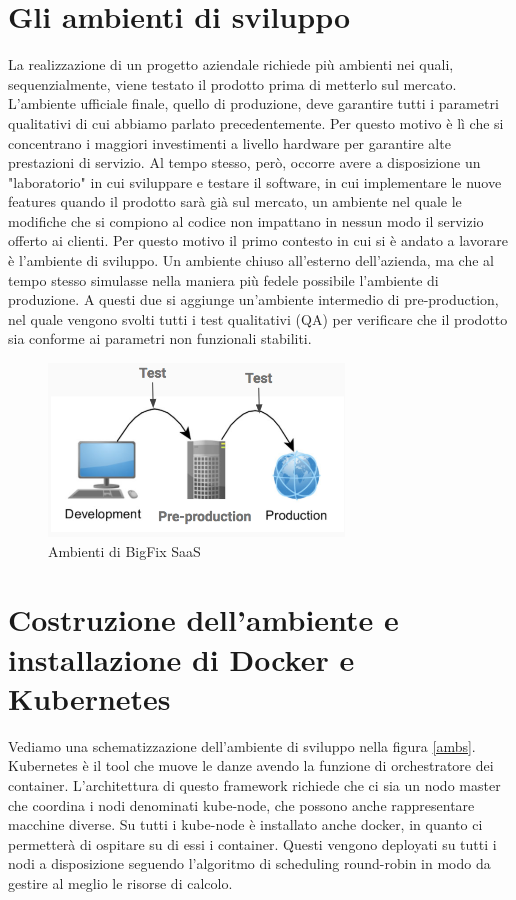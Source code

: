 \section{Gli ambienti di sviluppo }
La realizzazione di un progetto aziendale richiede più ambienti nei quali, sequenzialmente, viene testato il prodotto prima di metterlo sul mercato. L'ambiente ufficiale finale, quello di produzione, deve garantire tutti i parametri qualitativi di cui abbiamo parlato precedentemente. Per questo motivo è lì che si concentrano i maggiori investimenti a livello hardware per garantire alte prestazioni di servizio. Al tempo stesso, però, occorre avere a disposizione un "laboratorio" in cui sviluppare e testare il software, in cui implementare le nuove features quando il prodotto sarà già sul mercato, un ambiente nel quale le modifiche che si compiono al codice non impattano in nessun modo il servizio offerto ai clienti. Per questo motivo il primo contesto in cui si è andato a lavorare è l'ambiente di sviluppo. Un ambiente chiuso all'esterno dell'azienda, ma che al tempo stesso simulasse nella maniera più fedele possibile l'ambiente di produzione. A questi due si aggiunge un'ambiente intermedio di pre-production, nel quale vengono svolti tutti i test qualitativi (QA) per verificare che il prodotto sia conforme ai parametri non funzionali stabiliti. 
\begin{figure}[h!]
	\centering
	\includegraphics[width=0.7\textwidth,keepaspectratio=true]{capitoli/imgs/ambientisviluppo.png}
	\caption{Ambienti di BigFix SaaS}
\end{figure}

\section{Costruzione dell'ambiente e installazione di Docker e Kubernetes}
Vediamo una schematizzazione dell'ambiente di sviluppo nella figura \ref{ambs}. Kubernetes è il tool che muove le danze avendo la funzione di orchestratore dei container. L'architettura di questo framework richiede che ci sia un nodo master che coordina i nodi denominati kube-node, che possono anche rappresentare macchine diverse. Su tutti i kube-node è installato anche docker, in quanto ci permetterà di ospitare su di essi i container. Questi vengono deployati su tutti i nodi a disposizione seguendo l'algoritmo di scheduling round-robin in modo da gestire al meglio le risorse di calcolo. 
